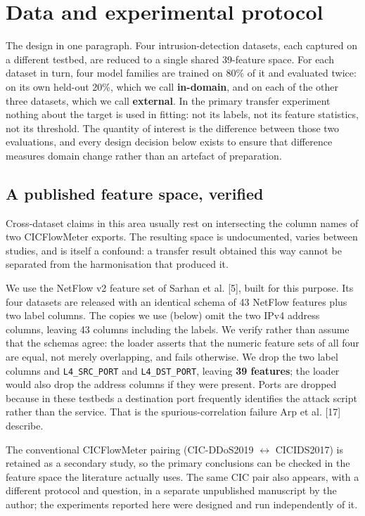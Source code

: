 \documentclass[preprint,12pt,nopreprintline]{elsarticle}
\begin{document}
\section{Data and experimental protocol}

The design in one paragraph. Four intrusion-detection datasets, each captured on a different testbed, are reduced to a single shared 39-feature space. For each dataset in turn, four model families are trained on 80\% of it and evaluated twice: on its own held-out 20\%, which we call \textbf{in-domain}, and on each of the other three datasets, which we call \textbf{external}. In the primary transfer experiment nothing about the target is used in fitting: not its labels, not its feature statistics, not its threshold. The quantity of interest is the difference between those two evaluations, and every design decision below exists to ensure that difference measures domain change rather than an artefact of preparation.

\subsection{A published feature space, verified}

Cross-dataset claims in this area usually rest on intersecting the column names of two CICFlowMeter exports. The resulting space is undocumented, varies between studies, and is itself a confound: a transfer result obtained this way cannot be separated from the harmonisation that produced it.

We use the NetFlow v2 feature set of Sarhan et al. [5], built for this purpose. Its four datasets are released with an identical schema of 43 NetFlow features plus two label columns. The copies we use (below) omit the two IPv4 address columns, leaving 43 columns including the labels. We verify rather than assume that the schemas agree: the loader asserts that the numeric feature sets of all four are equal, not merely overlapping, and fails otherwise. We drop the two label columns and \texttt{L4\_SRC\_PORT} and \texttt{L4\_DST\_PORT}, leaving \textbf{39 features}; the loader would also drop the address columns if they were present. Ports are dropped because in these testbeds a destination port frequently identifies the attack script rather than the service. That is the spurious-correlation failure Arp et al. [17] describe.

The conventional CICFlowMeter pairing (CIC-DDoS2019 \ensuremath{\leftrightarrow} CICIDS2017) is retained as a secondary study, so the primary conclusions can be checked in the feature space the literature actually uses. The same CIC pair also appears, with a different protocol and question, in a separate unpublished manuscript by the author; the experiments reported here were designed and run independently of it.
\end{document}
